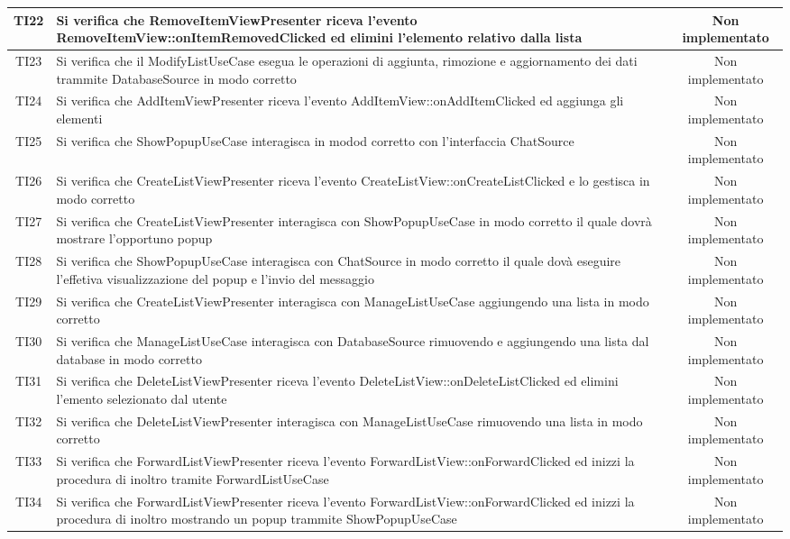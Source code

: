 \begin{center}
\begin{longtable}{|c|>{\centering}m{10cm}|c|}
		TI22 & Si verifica che RemoveItemViewPresenter riceva l'evento RemoveItemView::onItemRemovedClicked ed elimini l'elemento relativo dalla lista & Non implementato \\ \hline
		TI23 & Si verifica che il ModifyListUseCase esegua le operazioni di aggiunta, rimozione e aggiornamento dei dati trammite DatabaseSource in modo corretto & Non implementato \\ \hline
		TI24 & Si verifica che AddItemViewPresenter riceva l'evento AddItemView::onAddItemClicked ed aggiunga gli elementi & Non implementato \\ \hline
		TI25 & Si verifica che ShowPopupUseCase interagisca in modod corretto con l'interfaccia ChatSource & Non implementato \\ \hline
		TI26 & Si verifica che CreateListViewPresenter riceva l'evento CreateListView::onCreateListClicked e lo gestisca in modo corretto & Non implementato \\ \hline
		TI27 & Si verifica che CreateListViewPresenter interagisca con ShowPopupUseCase in modo corretto il quale dovrà mostrare l'opportuno popup & Non implementato \\ \hline
		TI28 & Si verifica che ShowPopupUseCase interagisca con ChatSource in modo corretto il quale dovà eseguire l'effetiva visualizzazione del popup e l'invio del messaggio & Non implementato \\ \hline
		TI29 & Si verifica che CreateListViewPresenter interagisca con ManageListUseCase aggiungendo una lista in modo corretto & Non implementato \\ \hline
		TI30 & Si verifica che ManageListUseCase interagisca con DatabaseSource rimuovendo e aggiungendo una lista dal database in modo corretto & Non implementato \\ \hline
		TI31 & Si verifica che DeleteListViewPresenter riceva l'evento DeleteListView::onDeleteListClicked ed elimini l'emento selezionato dal utente & Non implementato \\ \hline
		TI32 & Si verifica che DeleteListViewPresenter interagisca con ManageListUseCase rimuovendo una lista in modo corretto & Non implementato \\ \hline
		TI33 & Si verifica che ForwardListViewPresenter riceva l'evento ForwardListView::onForwardClicked ed inizzi la procedura di inoltro tramite ForwardListUseCase & Non implementato \\ \hline
		TI34 & Si verifica che ForwardListViewPresenter riceva l'evento ForwardListView::onForwardClicked ed inizzi la procedura di inoltro mostrando un popup trammite ShowPopupUseCase & Non implementato \\ \hline

\end{longtable}
\end{center}
